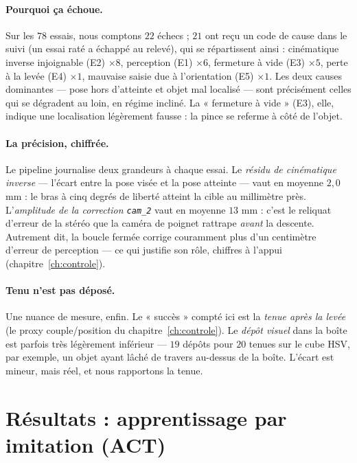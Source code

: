 \paragraph{Pourquoi ça échoue.} Sur les $78$ essais, nous comptons $22$ échecs ; $21$ ont reçu un code de cause dans le suivi (un essai raté a échappé au relevé), qui se répartissent ainsi : cinématique inverse injoignable (E2) $\times 8$, perception (E1) $\times 6$, fermeture à vide (E3) $\times 5$, perte à la levée (E4) $\times 1$, mauvaise saisie due à l'orientation (E5) $\times 1$. Les deux causes dominantes --- pose hors d'atteinte et objet mal localisé --- sont précisément celles qui se dégradent au loin, en régime incliné. La « fermeture à vide » (E3), elle, indique une localisation légèrement fausse : la pince se referme à côté de l'objet.

\paragraph{La précision, chiffrée.} Le pipeline journalise deux grandeurs à chaque essai. Le \emph{résidu de cinématique inverse} --- l'écart entre la pose visée et la pose atteinte --- vaut en moyenne $2{,}0$ mm : le bras à cinq degrés de liberté atteint la cible au millimètre près. L'\emph{amplitude de la correction \texttt{cam\_2}} vaut en moyenne $13$ mm : c'est le reliquat d'erreur de la stéréo que la caméra de poignet rattrape \emph{avant} la descente. Autrement dit, la boucle fermée corrige couramment plus d'un centimètre d'erreur de perception --- ce qui justifie son rôle, chiffres à l'appui (chapitre~\ref{ch:controle}).

\paragraph{Tenu n'est pas déposé.} Une nuance de mesure, enfin. Le « succès » compté ici est la \emph{tenue après la levée} (le proxy couple/position du chapitre~\ref{ch:controle}). Le \emph{dépôt visuel} dans la boîte est parfois très légèrement inférieur --- $19$ dépôts pour $20$ tenues sur le cube HSV, par exemple, un objet ayant lâché de travers au-dessus de la boîte. L'écart est mineur, mais réel, et nous rapportons la tenue.

\section{Résultats : apprentissage par imitation (ACT)}
\label{sec:eval-il}

